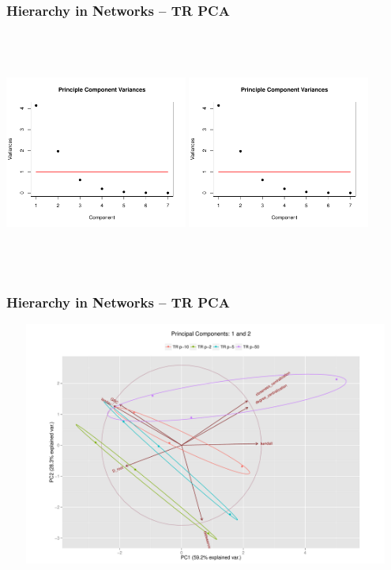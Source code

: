 \documentclass[xcolor={table}]{beamer}
\newenvironment{changemargin}[2]{%
  \begin{list}{}{%
    \setlength{\topsep}{0pt}%
    \setlength{\leftmargin}{#1}%
    \setlength{\rightmargin}{#2}%
    \setlength{\listparindent}{\parindent}%
    \setlength{\itemindent}{\parindent}%
    \setlength{\parsep}{\parskip}%
  }%
  \item[]}{\end{list}}
\begin{document}
\begin{frame}\frametitle{Hierarchy in Networks -- TR PCA}
	\begin{changemargin}{-2cm}{ -2cm}
		\centering
	\includegraphics[width=6cm, height=8cm]{images/TR_Param_PCA_Component_Varinces.pdf}
	\includegraphics[width=6cm, height=8cm]{images/TR_Size_PCA_Component_Varinces.pdf}
	\end{changemargin}
\end{frame}

\begin{frame}\frametitle{Hierarchy in Networks -- TR PCA}
	\begin{changemargin}{-2cm}{ -2cm}
		\centering
		\includegraphics[width=15cm, height=8cm]{images/TR_Param_PCA_Components1_2.pdf}
	\end{changemargin}
\end{frame}
\end{document}
